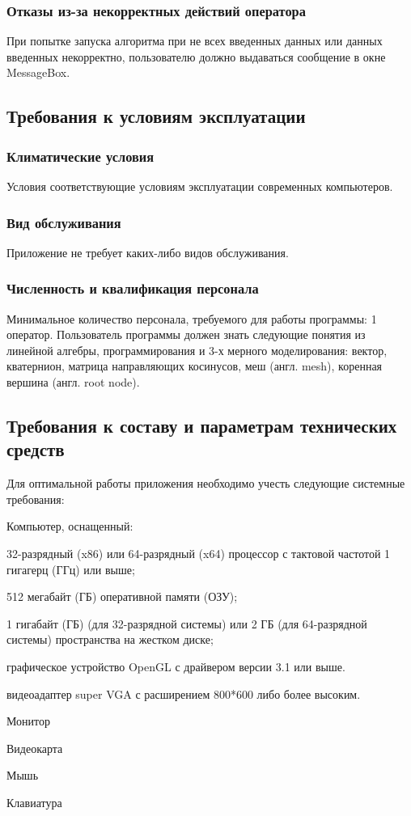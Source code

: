 \subsubsection{Отказы из-за некорректных действий оператора}
При попытке запуска алгоритма при не всех введенных данных или данных введенных некорректно, пользователю должно выдаваться сообщение в окне MessageBox.


\subsection{Требования к условиям эксплуатации}
\subsubsection{Климатические условия}
Условия соответствующие условиям эксплуатации современных компьютеров.
\subsubsection{Вид обслуживания}
Приложение не требует каких-либо видов обслуживания.
\subsubsection{Численность и квалификация персонала}
Минимальное количество персонала, требуемого для работы программы: 1 оператор. Пользователь программы должен знать следующие понятия из линейной алгебры, программирования и 3-х мерного моделирования: вектор, кватернион, матрица направляющих косинусов, меш (англ. mesh), коренная вершина (англ. root node).


\subsection{Требования к составу и параметрам технических средств}
Для оптимальной работы приложения необходимо учесть следующие системные требования:
\begin{my_enumerate}
\item Компьютер, оснащенный:
    \begin{my_enumerate}
    \item 32-разрядный (x86) или 64-разрядный (x64) процессор с тактовой частотой 1 гигагерц (ГГц) или выше;
    \item 512 мегабайт (ГБ) оперативной памяти (ОЗУ);
    \item 1 гигабайт (ГБ) (для 32-разрядной системы) или 2 ГБ (для 64-разрядной системы) пространства на жестком диске;
    \item графическое устройство OpenGL с драйвером версии 3.1 или выше.
    \item видеоадаптер super VGA с расширением 800*600 либо более высоким.
    \end{my_enumerate}
\item Монитор
\item Видеокарта
\item Мышь
\item Клавиатура
\end{my_enumerate}


